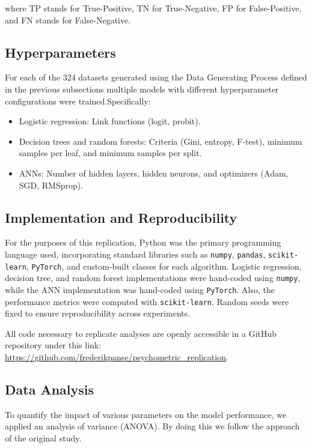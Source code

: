 \documentclass[12pt]{article}
\begin{document}
where TP stands for True-Positive, TN for True-Negative, FP for False-Positive, and FN stands for False-Negative.  

\subsection{Hyperparameters}

For each of the 324 datasets generated using the Data Generating Process defined in the previous subsections multiple models with different hyperparameter configurations were trained.Specifically:

\begin{itemize}
\item Logistic regression: Link functions (logit, probit).
\item Decision trees and random forests: Criteria (Gini, entropy, F-test), minimum samples per leaf, and minimum samples per split.
\item ANNs: Number of hidden layers, hidden neurons, and optimizers (Adam, SGD, RMSprop).
\end{itemize}

\subsection{Implementation and Reproducibility}

For the purposes of this replication, Python was the primary programming language used, incorporating standard libraries such as \texttt{numpy}, \texttt{pandas}, \texttt{scikit-learn}, \texttt{PyTorch}, and custom-built classes for each algorithm. Logistic regression, decision tree, and random forest implementations were hand-coded using \texttt{numpy}, while the ANN implementation was hand-coded using \texttt{PyTorch}. Also, the performance metrics were computed with \texttt{scikit-learn}. Random seeds were fixed to ensure reproducibility across experiments.

All code necessary to replicate analyses are openly accessible in a GitHub repository under this link: \url{https://github.com/frederikpanse/psychometric_replication}.

\subsection{Data Analysis}
To quantify the impact of various parameters on the model performance, we applied an analysis of variance (ANOVA). By doing this we follow the approach of the original study.
\end{document}

